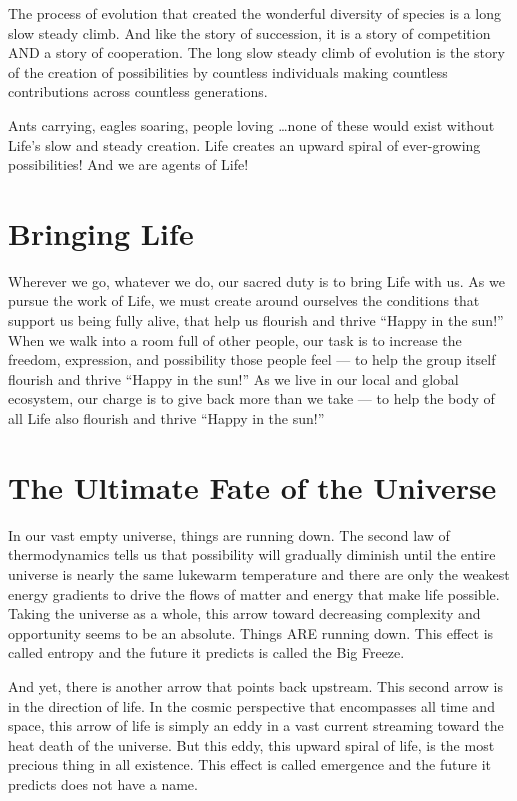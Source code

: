 \documentclass[ebook,12pt,openany,twoside]{memoir}
\begin{document}
The process of evolution that created the wonderful diversity of species is a
long slow steady climb. And like the story of succession, it is a story of
competition AND a story of cooperation. The long slow steady climb of evolution
is the story of the creation of possibilities by countless individuals making
countless contributions across countless generations.

Ants carrying, eagles soaring, people loving \ldots none of these would exist
without Life's slow and steady creation. Life creates an upward spiral of
ever-growing possibilities! And we are agents of Life!

\chapter{Bringing Life}

Wherever we go, whatever we do, our sacred duty is to bring Life with us. As we
pursue the work of Life, we must create around ourselves the conditions that
support us being fully alive, that help us flourish and thrive ``Happy in the
sun!'' When we walk into a room full of other people, our task is to increase
the freedom, expression, and possibility those people feel --- to help the
group itself flourish and thrive ``Happy in the sun!'' As we live in our local
and global ecosystem, our charge is to give back more than we take --- to help
the body of all Life also flourish and thrive ``Happy in the sun!''

\chapter{The Ultimate Fate of the Universe}

In our vast empty universe, things are running down. The second law of
thermodynamics tells us that possibility will gradually diminish until the
entire universe is nearly the same lukewarm temperature and there are only the
weakest energy gradients to drive the flows of matter and energy that make life
possible. Taking the universe as a whole, this arrow toward decreasing
complexity and opportunity seems to be an absolute. Things ARE running down.
This effect is called entropy and the future it predicts is called the Big
Freeze.

And yet, there is another arrow that points back upstream. This second arrow is
in the direction of life. In the cosmic perspective that encompasses all time
and space, this arrow of life is simply an eddy in a vast current streaming
toward the heat death of the universe. But this eddy, this upward spiral of
life, is the most precious thing in all existence. This effect is called
emergence and the future it predicts does not have a name.
\end{document}
